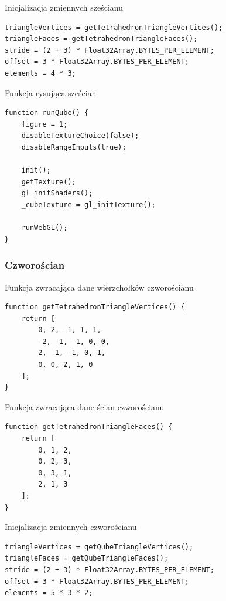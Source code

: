 \documentclass[12pt,a4paper,titlepage]{article}
\begin{document}
\begin{listing}[H]
\caption{Inicjalizacja zmiennych sześcianu}
\begin{verbatim}
triangleVertices = getTetrahedronTriangleVertices();
triangleFaces = getTetrahedronTriangleFaces();
stride = (2 + 3) * Float32Array.BYTES_PER_ELEMENT;
offset = 3 * Float32Array.BYTES_PER_ELEMENT;
elements = 4 * 3;
\end{verbatim}
\end{listing}

\begin{listing}[H]
\caption{Funkcja rysująca sześcian}
\begin{verbatim}
function runQube() {
    figure = 1;
    disableTextureChoice(false);
    disableRangeInputs(true);

    init();
    getTexture();
    gl_initShaders();
    _cubeTexture = gl_initTexture();
    
    runWebGL();
}
\end{verbatim}
\end{listing}

\subsubsection{Czworościan}

\begin{listing}[H]
\caption{Funkcja zwracająca dane wierzchołków czworościanu}
\begin{verbatim}
function getTetrahedronTriangleVertices() {
    return [
        0, 2, -1, 1, 1,
        -2, -1, -1, 0, 0,
        2, -1, -1, 0, 1,
        0, 0, 2, 1, 0
    ];
}
\end{verbatim}
\end{listing}

\begin{listing}[H]
\caption{Funkcja zwracająca dane ścian czworościanu}
\begin{verbatim}
function getTetrahedronTriangleFaces() {
    return [
        0, 1, 2,
        0, 2, 3,
        0, 3, 1,
        2, 1, 3
    ];
}
\end{verbatim}
\end{listing}

\begin{listing}[H]
\caption{Inicjalizacja zmiennych czworościanu}
\begin{verbatim}
triangleVertices = getQubeTriangleVertices();
triangleFaces = getQubeTriangleFaces();
stride = (2 + 3) * Float32Array.BYTES_PER_ELEMENT;
offset = 3 * Float32Array.BYTES_PER_ELEMENT;
elements = 5 * 3 * 2;
\end{verbatim}
\end{listing}
\end{document}
